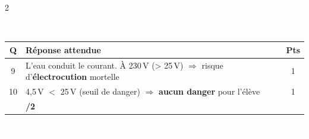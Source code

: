\documentclass[10pt,a4paper,landscape]{article}
\newcommand{\exotitle}[2]{%
  \noindent\colorbox{exoheader}{%
    \parbox{\dimexpr\linewidth-2\fboxsep\relax}{%
      \textcolor{white}{\textbf{\large #1 \hfill #2}}%
    }%
  }%
}
\begin{document}
\begin{multicols}{2}
\vspace{4mm}

\exotitle{Questions de synthèse}{/2 pts}

\vspace{1mm}

\begin{tabularx}{\linewidth}{|c|X|c|}
  \hline
  \rowcolor{exolight}
  \textbf{Q} & \textbf{Réponse attendue} & \textbf{Pts} \\
  \hline
  9 & L'eau conduit le courant. À 230\,V (> 25\,V) $\Rightarrow$ risque d'\textbf{électrocution} mortelle & 1 \\
  \hline
  10 & 4,5\,V $<$ 25\,V (seuil de danger) $\Rightarrow$ \textbf{aucun danger} pour l'élève & 1 \\
  \hline
  \rowcolor{totalrow}
  \multicolumn{2}{|r|}{\textbf{Sous-total Synthèse}} & \textbf{/2} \\
  \hline
\end{tabularx}

\vspace{6mm}

\noindent\colorbox{exoheader}{%
  \parbox{\dimexpr\linewidth-2\fboxsep\relax}{%
    \textcolor{white}{\textbf{\Large TOTAL \hfill /20 points}}%
  }%
}

\end{multicols}
\end{document}
